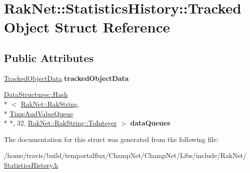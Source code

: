 \hypertarget{struct_rak_net_1_1_statistics_history_1_1_tracked_object}{\section{Rak\-Net\-:\-:Statistics\-History\-:\-:Tracked\-Object Struct Reference}
\label{struct_rak_net_1_1_statistics_history_1_1_tracked_object}
}
\subsection*{Public Attributes}
\begin{DoxyCompactItemize}
\item 
\hypertarget{struct_rak_net_1_1_statistics_history_1_1_tracked_object_a52628b016d7fcf56f8f6ddbfd36b61be}{\hyperlink{struct_rak_net_1_1_statistics_history_1_1_tracked_object_data}{Tracked\-Object\-Data} {\bfseries tracked\-Object\-Data}}\label{struct_rak_net_1_1_statistics_history_1_1_tracked_object_a52628b016d7fcf56f8f6ddbfd36b61be}

\item 
\hypertarget{struct_rak_net_1_1_statistics_history_1_1_tracked_object_af5b952a522b8c2e1cb67804c63c0f31d}{\hyperlink{class_data_structures_1_1_hash}{Data\-Structures\-::\-Hash}\\*
$<$ \hyperlink{class_rak_net_1_1_rak_string}{Rak\-Net\-::\-Rak\-String}, \\*
\hyperlink{struct_rak_net_1_1_statistics_history_1_1_time_and_value_queue}{Time\-And\-Value\-Queue} \\*
$\ast$, 32, \hyperlink{class_rak_net_1_1_rak_string_a79f546baedf74c64a820297b40590250}{Rak\-Net\-::\-Rak\-String\-::\-To\-Integer} $>$ {\bfseries data\-Queues}}\label{struct_rak_net_1_1_statistics_history_1_1_tracked_object_af5b952a522b8c2e1cb67804c63c0f31d}

\end{DoxyCompactItemize}


The documentation for this struct was generated from the following file\-:\begin{DoxyCompactItemize}
\item 
/home/travis/build/temportalflux/\-Champ\-Net/\-Champ\-Net/\-Libs/include/\-Rak\-Net/\hyperlink{_statistics_history_8h}{Statistics\-History.\-h}\end{DoxyCompactItemize}
